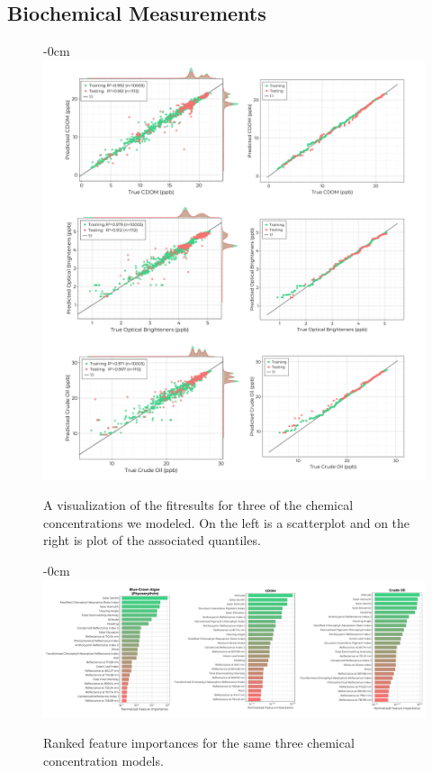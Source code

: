 \documentclass[journal,article,submit,pdftex,moreauthors]{Definitions/mdpi}
\begin{document}
\subsection{Biochemical Measurements}


\begin{figure}[H]
\begin{adjustwidth}{-\extralength}{0cm}
\centering
\includegraphics[width=16.0cm]{paper/figures/results/fits/chemical-fitres.pdf}
\end{adjustwidth}
\caption{A visualization of the fitresults for three of the chemical concentrations we modeled. On the left is a scatterplot and on the right is plot of the associated quantiles.\label{fig:chemicals-fit}}
\end{figure}  

\begin{figure}[H]
\begin{adjustwidth}{-\extralength}{0cm}
\centering
\includegraphics[width=18.0cm]{paper/figures/results/fits/chemical-ranking.pdf}
\end{adjustwidth}
\caption{Ranked feature importances for the same three chemical concentration models.\label{fig:chemicals-fit}}
\end{figure}  
\end{document}
